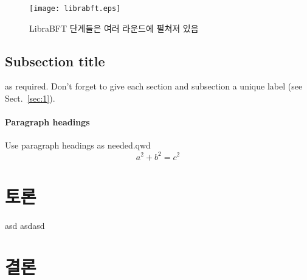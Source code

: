 \begin{figure}
  \texttt{[image: librabft.eps]}
\caption{LibraBFT 단계들은 여러 라운드에 펼쳐져 있음}
\label{fig:2}       %
\end{figure}


\subsection{Subsection title}
\label{sec:11}
as required. Don't forget to give each section
and subsection a unique label (see Sect.~\ref{sec:1}).
\paragraph{Paragraph headings} Use paragraph headings as needed.qwd 
\begin{equation}
a^2+b^2=c^2
\end{equation}

%
%

\section{토론}
\label{sec:2}
asd asdasd
\section{결론}
\label{sec:3}

